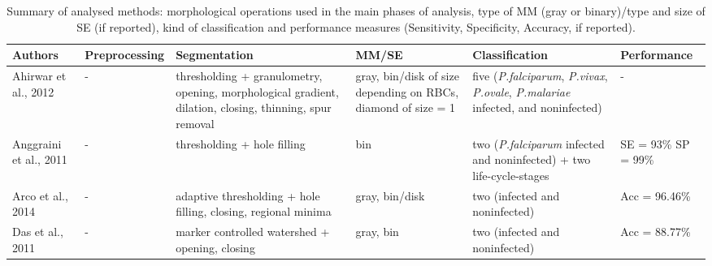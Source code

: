 \documentclass[sensors,review,accept,moreauthors,pdftex,10pt,a4paper]{mdpi}
\begin{document}
 \begin{table}[H]
\centering
\tablesize{\footnotesize} 
\caption{Summary of analysed methods: morphological operations used in the main phases of analysis, type of MM (gray or binary)/type and size of SE (if reported), kind of classification and performance measures (Sensitivity, Specificity, Accuracy, if reported).}

\label{t1}
\begin{tabular}{m{3cm}<{\centering}m{3cm}<{\centering}m{5cm}<{\centering}m{3cm}<{\centering}m{5cm}<{\centering}m{2cm}<{\centering}}
		\toprule
    	\textbf{Authors} & \textbf{Preprocessing} & \textbf{Segmentation} & \textbf{MM/SE} & \textbf{Classification} & \textbf{Performance}\\  \midrule
    Ahirwar et al., 2012  &
    	- &
    	thresholding + granulometry, opening, morphological gradient, dilation, closing, thinning, spur removal &
    	gray, bin/disk of size depending on RBCs, diamond of size = 1 &
    	five (\emph{P.falciparum}, \emph{P.vivax}, \emph{P.ovale}, \emph{P.malariae} infected, and noninfected) &
    	-  \\
\midrule
    Anggraini et al., 2011 &
		- &
		thresholding + hole filling &	
		bin &
		two (\emph{P.falciparum} infected and noninfected) + two life-cycle-stages &
		SE = 93\% SP = 99\%
		\\
		\midrule
    Arco et al., 2014 &
		- &
		adaptive thresholding + hole filling, closing, regional minima &	
		gray, bin/disk &
		two (infected and noninfected) &
		Acc = 96.46\%
        \\
        \midrule

    Das et al., 2011 &
		- &
		marker controlled watershed + opening, closing &	
		gray, bin  &
		two (infected and noninfected) &
		Acc = 88.77\%
        \\
        \midrule


\end{tabular}
\end{table}
\end{document}

